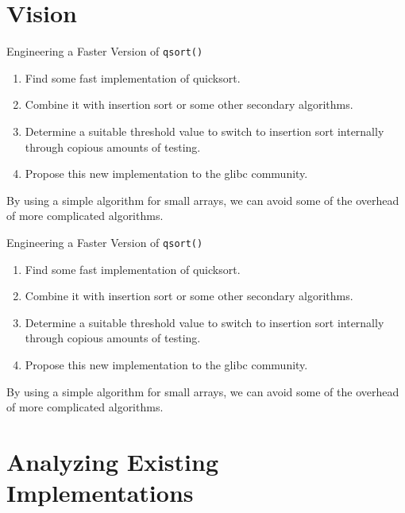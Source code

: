 \documentclass[13pt]{beamer}
\begin{document}
\section{Vision}
\begin{frame}{Engineering a Faster Version of \texttt{qsort()}}
	\pause
	\begin{enumerate}
		\item Find some fast implementation of quicksort.
		\item Combine it with insertion sort or some other secondary
		      algorithms.
		\item Determine a suitable threshold value to switch to insertion sort
		      internally through copious amounts of testing.
		\item Propose this new implementation to the glibc community.
	\end{enumerate}

	\pause
	\vspace{0.3cm}
	By using a simple algorithm for small arrays, we can avoid some of the
	overhead of more complicated algorithms.
\end{frame}
\begin{frame}{Engineering a Faster Version of \texttt{qsort()}}
	\begin{enumerate}
		\item Find some fast implementation of quicksort.
		\item Combine it with insertion sort or some other secondary
		      algorithms.
		\item \color{red}Determine a suitable threshold value to switch to insertion sort
		      internally through copious amounts of testing.\normalcolor
		\item Propose this new implementation to the glibc community.
	\end{enumerate}

	\vspace{0.3cm}
	By using a simple algorithm for small arrays, we can avoid some of the
	overhead of more complicated algorithms.
\end{frame}


\section{Analyzing Existing Implementations}
\end{document}
